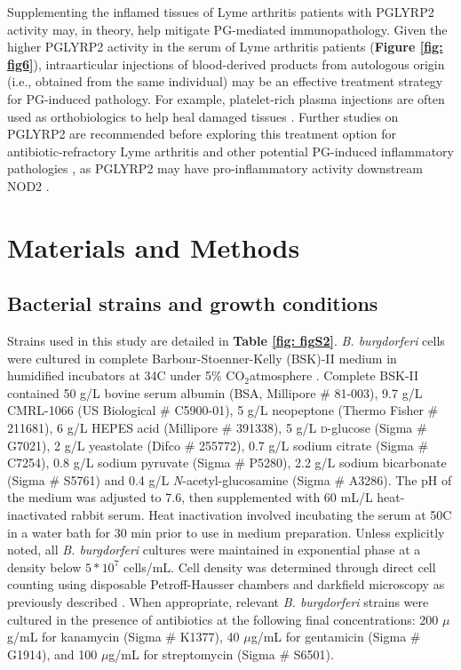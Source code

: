 \documentclass[twoside, watermark]{zHenriquesLab-StyleBioRxiv}
\newcommand{\tmu}{$\mu$} %
\newcommand{\COtwo}{CO$_\text{2}$} %
\newcommand{\scd}{\textsc{d}} %
\begin{document}
\vspace{1mm}
Supplementing the inflamed tissues of Lyme arthritis patients with PGLYRP2 activity may, in theory, help mitigate PG-mediated immunopathology. Given the higher PGLYRP2 activity in the serum of Lyme arthritis patients (\textbf{Figure \ref{fig: fig6}}), intraarticular injections of blood-derived products from autologous origin (i.e., obtained from the same individual) may be an effective treatment strategy for PG-induced pathology. For example, platelet-rich plasma injections are often used as orthobiologics to help heal damaged tissues \cite{Beitzel2015,Jeyaraman2024}. Further studies on PGLYRP2 are recommended before exploring this treatment option for antibiotic-refractory Lyme arthritis and other potential PG-induced inflammatory pathologies \cite{Holub2024,Schrijver2001,Schrijver2000}, as PGLYRP2 may have pro-inflammatory activity downstream NOD2 \cite{Clowers2013}.

\section*{Materials and Methods}
\subsection*{Bacterial strains and growth conditions}
Strains used in this study are detailed in \textbf{Table \ref{fig: figS2}}. \textit{B. burgdorferi} cells were cultured in complete Barbour-Stoenner-Kelly (BSK)-II medium in humidified incubators at 34\degree C under 5\% \COtwo atmosphere \cite{Barbour1984,Jutras2013,Zuckert2007}. Complete BSK-II contained 50 g/L bovine serum albumin (BSA, Millipore \# 81-003), 9.7 g/L CMRL-1066 (US Biological \# C5900-01), 5 g/L neopeptone (Thermo Fisher \# 211681), 6 g/L HEPES acid (Millipore \# 391338), 5 g/L \scd-glucose (Sigma \# G7021), 2 g/L yeastolate (Difco \# 255772), 0.7 g/L sodium citrate (Sigma \# C7254), 0.8 g/L sodium pyruvate (Sigma \# P5280), 2.2 g/L sodium bicarbonate (Sigma \# S5761) and 0.4 g/L \textit{N}-acetyl-glucosamine (Sigma \# A3286). The pH of the medium was adjusted to 7.6, then supplemented with 60 mL/L heat-inactivated rabbit serum. Heat inactivation involved incubating the serum at 50\degree C in a water bath for 30 min prior to use in medium preparation. Unless explicitly noted, all \textit{B. burgdorferi} cultures were maintained in exponential phase at a density below $5 * 10^7$ cells/mL. Cell density was determined through direct cell counting using disposable Petroff-Hausser chambers and darkfield microscopy as previously described \cite{Takacs2018}. When appropriate, relevant \textit{B. burgdorferi} strains were cultured in the presence of antibiotics at the following final concentrations: 200 \tmu g/mL for kanamycin \cite{Bono2000} (Sigma \# K1377), 40 \tmu g/mL for gentamicin \cite{Elias2003} (Sigma \# G1914), and 100 \tmu g/mL for streptomycin \cite{Frank2003} (Sigma \# S6501).
\end{document}
